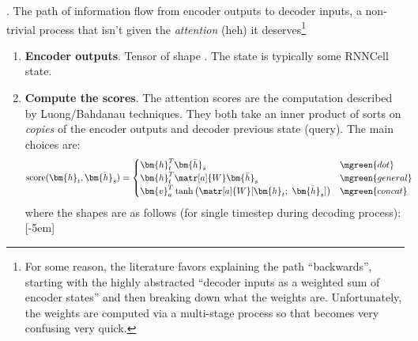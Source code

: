 \documentclass[11pt]{article}
\renewcommand\vec[2][]{\bm{#2}_{#1}}
\newcommand\p{\Needspace{10\baselineskip} \noindent}
\begin{document}
\p {}. The path of information flow from encoder outputs to decoder inputs, a non-trivial process that isn't given the \textit{attention} (heh) it deserves\footnote{For some reason, the literature favors explaining the path ``backwards'', starting with the highly abstracted ``decoder inputs as a weighted sum of encoder states'' and then breaking down what the weights are. Unfortunately, the weights are computed via a multi-stage process so that becomes very confusing very quick.}
\begin{enumerate}
	\item \textbf{Encoder outputs}. Tensor of shape . The state is typically some RNNCell state.
	
	
	\item \textbf{Compute the scores}. The attention scores are the computation described by Luong/Bahdanau techniques. They both take an inner product of sorts on \textit{copies} of the encoder outputs and decoder previous state (query). The main choices are:
	\begin{align}
				\text{score}(\vec[t]{h}, \vec[s]{\bar h}) 
				&= \begin{cases}
				\vec[t]{h}^T \vec[s]{\bar h} & \mgreen{dot} \\
				\vec[t]{h}^T \matr[a]{W} \vec[s]{\bar h} & \mgreen{general} \\
				\vec[a]{v}^T \tanh\left(\matr[a]{W} [\vec[t]{h}; ~ \vec[s]{\bar h}] \right) & \mgreen{concat} 
				\end{cases}
	\end{align}
	where the shapes are as follows (for single timestep during decoding process):[-5em]
		

\end{enumerate}
\end{document}
